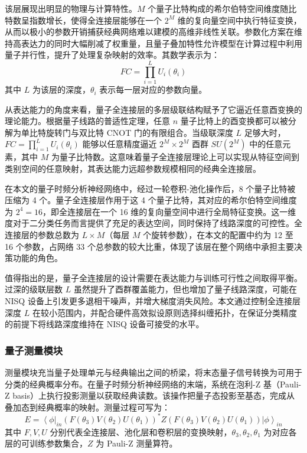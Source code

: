 该层展现出明显的物理与计算特性。$M$ 个量子比特构成的希尔伯特空间维度随比特数呈指数增长，使得全连接层能够在一个 $2^M$ 维的复向量空间中执行特征变换，从而以极小的参数开销捕获经典网络难以建模的高维非线性关联。参数化方案在维持高表达力的同时大幅削减了权重量，且量子叠加特性允许模型在计算过程中利用量子并行性，提升了处理复杂映射的效率。其数学表示为：
\begin{equation}
	FC = \prod_{i=1}^L U_i\left(\theta_i\right)
	\label{eq:q_fc}
\end{equation}
其中 $L$ 为该层的深度，$\theta_i$ 表示每一层对应的参数向量。

从表达能力的角度来看，量子全连接层的多层级联结构赋予了它逼近任意酉变换的理论能力。根据量子线路的普适性定理，任意 $n$ 量子比特上的酉变换都可以被分解为单比特旋转门与双比特 CNOT 门的有限组合。当级联深度 $L$ 足够大时，$FC = \prod_{i=1}^L U_i(\theta_i)$ 能够以任意精度逼近 $2^M \times 2^M$ 酉群 $SU(2^M)$ 中的任意元素，其中 $M$ 为量子比特数。这意味着量子全连接层理论上可以实现从特征空间到类别空间的任意映射，其表达能力远超参数规模相同的经典全连接层。

在本文的量子时频分析神经网络中，经过一轮卷积-池化操作后，8 个量子比特被压缩为 4 个。量子全连接层作用于这 4 个量子比特，其对应的希尔伯特空间维度为 $2^4 = 16$，即全连接层在一个 16 维的复向量空间中进行全局特征变换。这一维度对于二分类任务而言提供了充足的表达空间，同时保持了线路深度的可控性。全连接层的参数总数为 $L \times M$（每层 $M$ 个旋转参数），在本文的配置中约为 12 至 16 个参数，占网络 33 个总参数的较大比重，体现了该层在整个网络中承担主要决策功能的角色。

值得指出的是，量子全连接层的设计需要在表达能力与训练可行性之间取得平衡。过深的级联层数 $L$ 虽然提升了酉群覆盖能力，但也增加了量子线路深度，可能在 NISQ 设备上引发更多退相干噪声，并增大梯度消失风险。本文通过控制全连接层深度 $L$ 在较小范围内，并配合硬件高效拟设原则选择纠缠拓扑，在保证分类精度的前提下将线路深度维持在 NISQ 设备可接受的水平。

\subsubsection{量子测量模块}
\label{subsec:q_measure}

测量模块充当量子处理单元与经典输出之间的桥梁，将末态量子信号转换为可用于分类的经典概率分布。在量子时频分析神经网络的末端，系统在泡利-Z 基（Pauli-Z basis）上执行投影测量以获取经典读数。该操作把量子态投影至基态，完成从叠加态到经典概率的映射。测量过程可写为：
\begin{equation}
	E = \left\langle\phi\right|_{in} \left(F(\theta_3)V(\theta_2)U(\theta_1)\right)^* Z \left(F(\theta_3)V(\theta_2)U(\theta_1)\right) \left|\phi\right\rangle_{in}
	\label{eq:q_measure}
\end{equation}
其中 $F, V, U$ 分别代表全连接层、池化层和卷积层的变换映射，$\theta_3, \theta_2, \theta_1$ 为对应各层的可训练参数集合，$Z$ 为 Pauli-Z 测量算符。

